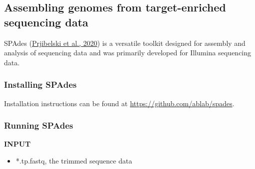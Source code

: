 \documentclass[
  12pt,
]{article}
\providecommand{\tightlist}{%
  \setlength{\itemsep}{0pt}\setlength{\parskip}{0pt}}
\begin{document}
\hypertarget{assembling-genomes-from-target-enriched-sequencing-data}{%
\subsection{Assembling genomes from target-enriched sequencing data}\label{assembling-genomes-from-target-enriched-sequencing-data}}

SPAdes (\protect\hyperlink{ref-Prjibelski2020}{Prjibelski et al., 2020}) is a versatile toolkit designed for assembly and analysis of sequencing data and was primarily developed for Illumina sequencing data.

\hypertarget{installing-spades}{%
\subsubsection{Installing SPAdes}\label{installing-spades}}

Installation instructions can be found at \url{https://github.com/ablab/spades}.

\hypertarget{running-spades}{%
\subsubsection{Running SPAdes}\label{running-spades}}

\textbf{INPUT}

\begin{itemize}
\tightlist
\item
  *.tp.fastq, the trimmed sequence data
\end{itemize}
\end{document}
